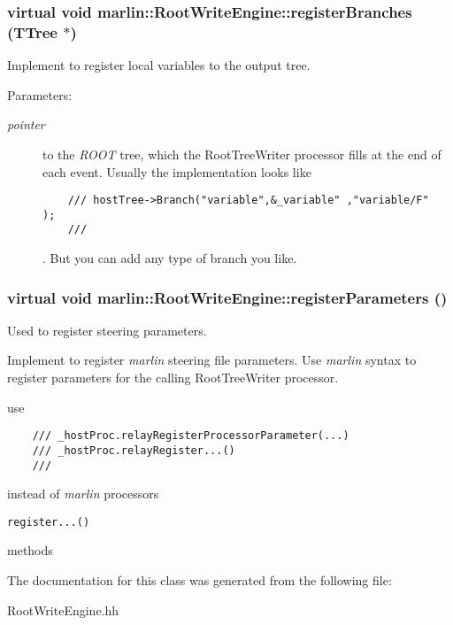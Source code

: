 \subsubsection{\setlength{\rightskip}{0pt plus 5cm}virtual void marlin::Root\-Write\-Engine::register\-Branches (TTree $\ast$)\hspace{0.3cm}{\tt  [pure virtual]}}\label{classmarlin_1_1RootWriteEngine_a1fd821203fe59d00f0bc28b76904570}


Implement to register local variables to the output tree. 

\begin{Desc}
\item[Parameters:]
\begin{description}
\item[{\em pointer}]to the {\em ROOT\/} tree, which the Root\-Tree\-Writer processor fills at the end of each event. Usually the implementation looks like

\footnotesize\begin{verbatim}    /// hostTree->Branch("variable",&_variable" ,"variable/F"  );
    /// \end{verbatim}
\normalsize
. But you can add any type of branch you like. \end{description}
\end{Desc}
\subsubsection{\setlength{\rightskip}{0pt plus 5cm}virtual void marlin::Root\-Write\-Engine::register\-Parameters ()\hspace{0.3cm}{\tt  [pure virtual]}}\label{classmarlin_1_1RootWriteEngine_98171597757dfacdde11763d948dfe6c}


Used to register steering parameters. 

Implement to register {\em marlin\/} steering file parameters. Use {\em marlin\/} syntax to register parameters for the calling Root\-Tree\-Writer processor.

use

\footnotesize\begin{verbatim}    /// _hostProc.relayRegisterProcessorParameter(...)
    /// _hostProc.relayRegister...()
    /// \end{verbatim}
\normalsize
 instead of {\em marlin\/} processors

\footnotesize\begin{verbatim}register...() \end{verbatim}
\normalsize
 methods 

The documentation for this class was generated from the following file:\begin{CompactItemize}
\item 
Root\-Write\-Engine.hh\end{CompactItemize}
